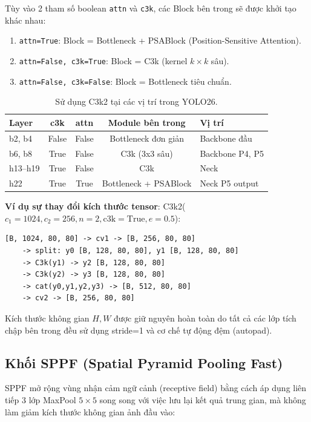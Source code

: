 Tùy vào 2 tham số boolean \texttt{attn} và \texttt{c3k}, các Block bên trong sẽ được khởi tạo khác nhau:
\begin{enumerate}
    \item \texttt{attn=True}: Block = Bottleneck + PSABlock (Position-Sensitive Attention).
    \item \texttt{attn=False, c3k=True}: Block = C3k (kernel $k \times k$ sâu).
    \item \texttt{attn=False, c3k=False}: Block = Bottleneck tiêu chuẩn.
\end{enumerate}

\begin{table}[H]
\centering
\small
\caption{Sử dụng C3k2 tại các vị trí trong YOLO26.}
\label{tab:c3k2_usage}
\begin{tabular}{lcccl}
\toprule
\textbf{Layer} & \textbf{c3k} & \textbf{attn} & \textbf{Module bên trong} & \textbf{Vị trí} \\
\midrule
b2, b4 & False & False & Bottleneck đơn giản & Backbone đầu \\
b6, b8 & True & False & C3k (3x3 sâu) & Backbone P4, P5 \\
h13--h19 & True & False & C3k & Neck \\
h22 & True & True & Bottleneck + PSABlock & Neck P5 output \\
\bottomrule
\end{tabular}
\end{table}

\textbf{Ví dụ sự thay đổi kích thước tensor}: C3k2($c_1=1024, c_2=256, n=2, \text{c3k}=\text{True}, e=0.5$):
\begin{verbatim}
[B, 1024, 80, 80] -> cv1 -> [B, 256, 80, 80]
    -> split: y0 [B, 128, 80, 80], y1 [B, 128, 80, 80]
    -> C3k(y1) -> y2 [B, 128, 80, 80]
    -> C3k(y2) -> y3 [B, 128, 80, 80]
    -> cat(y0,y1,y2,y3) -> [B, 512, 80, 80]
    -> cv2 -> [B, 256, 80, 80]
\end{verbatim}
Kích thước không gian $H, W$ được giữ nguyên hoàn toàn do tất cả các lớp tích chập bên trong đều sử dụng stride=1 và cơ chế tự động đệm (autopad).

\subsection{Khối SPPF (Spatial Pyramid Pooling Fast)}
\label{subsec:sppf}

SPPF mở rộng vùng nhận cảm ngữ cảnh (receptive field) bằng cách áp dụng liên tiếp 3 lớp MaxPool $5 \times 5$ song song với việc lưu lại kết quả trung gian, mà không làm giảm kích thước không gian ảnh đầu vào:

